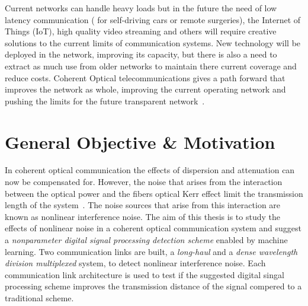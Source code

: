 Current networks can handle heavy loads but in the future the need of low latency communication ( for self-driving cars or remote surgeries), the Internet of Things (IoT), high quality video streaming and others will require creative solutions to the current limits of communication systems.  New technology will be deployed in the network, improving its capacity, but there is also a need to extract as much use from older networks to maintain there current coverage and reduce costs. Coherent Optical telecommunications gives a path forward that improves the network as whole, improving the current operating network and pushing the limits for the future transparent network~\cite{ModForm,NetGenTransp}.

\section{General Objective \& Motivation}	
In coherent optical communication the effects of dispersion and attenuation can now be compensated for. However, the noise that arises from the interaction between the optical power and the fibers optical Kerr effect limit the transmission length of the system~\cite{NLPNinCFO}. The noise sources that arise from this interaction are known as nonlinear interference noise. The aim of this thesis is to study the effects of nonlinear noise in a coherent optical communication system and suggest a \textit{nonparameter digital signal processing detection scheme} enabled by machine learning. Two communication links are built, a \textit{long-haul} and a \textit{dense wavelength division multiplexed} system, to detect nonlinear interference noise. Each communication link architecture is used to test if the suggested digital singal processing scheme improves the transmission distance of the signal compered to a  traditional scheme.    



